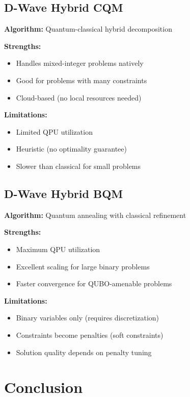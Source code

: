 \documentclass{article}
\begin{document}
\subsection{D-Wave Hybrid CQM}

\textbf{Algorithm:} Quantum-classical hybrid decomposition

\textbf{Strengths:}
\begin{itemize}
    \item Handles mixed-integer problems natively
    \item Good for problems with many constraints
    \item Cloud-based (no local resources needed)
\end{itemize}

\textbf{Limitations:}
\begin{itemize}
    \item Limited QPU utilization
    \item Heuristic (no optimality guarantee)
    \item Slower than classical for small problems
\end{itemize}

\subsection{D-Wave Hybrid BQM}

\textbf{Algorithm:} Quantum annealing with classical refinement

\textbf{Strengths:}
\begin{itemize}
    \item Maximum QPU utilization
    \item Excellent scaling for large binary problems
    \item Faster convergence for QUBO-amenable problems
\end{itemize}

\textbf{Limitations:}
\begin{itemize}
    \item Binary variables only (requires discretization)
    \item Constraints become penalties (soft constraints)
    \item Solution quality depends on penalty tuning
\end{itemize}

\section{Conclusion}
\end{document}
